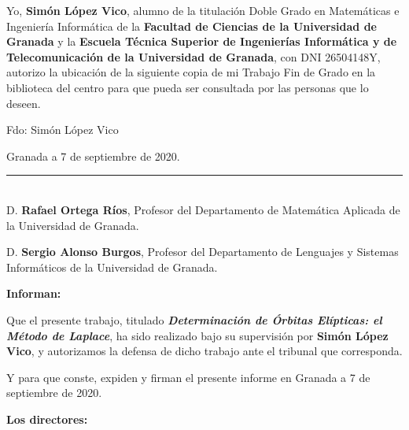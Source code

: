 Yo, \textbf{Simón López Vico}, alumno de la titulación Doble Grado en Matemáticas e Ingeniería Informática de la \textbf{Facultad de Ciencias de la Universidad de Granada} y la \textbf{Escuela Técnica Superior de Ingenierías Informática y de Telecomunicación de la Universidad de Granada}, con DNI 26504148Y, autorizo la ubicación de la siguiente copia de mi Trabajo Fin de Grado en la biblioteca del centro para que pueda ser consultada por las personas que lo deseen.

\vspace{6cm}

\noindent Fdo: Simón López Vico

\vspace{2cm}

\begin{flushright}
Granada a 7 de septiembre de 2020.
\end{flushright}

\clearpage{\thispagestyle{empty}\cleardoublepage}

\thispagestyle{empty}

\noindent\rule[-1ex]{\textwidth}{2pt}\\[4.5ex]

D. \textbf{Rafael Ortega Ríos}, Profesor del Departamento de Matemática Aplicada de la Universidad de Granada.

\vspace{0.5cm}

D. \textbf{Sergio Alonso Burgos}, Profesor del Departamento de Lenguajes y Sistemas Informáticos de la Universidad de Granada.


\vspace{0.5cm}

\textbf{Informan:}

\vspace{0.5cm}

Que el presente trabajo, titulado \textit{\textbf{Determinación de Órbitas Elípticas: el Método de Laplace}}, ha sido realizado bajo su supervisión por \textbf{Simón López Vico}, y autorizamos la defensa de dicho trabajo ante el tribunal que corresponda.

\vspace{0.5cm}

Y para que conste, expiden y firman el presente informe en Granada a 7 de septiembre de 2020.

\vspace{1cm}

\textbf{Los directores:}

